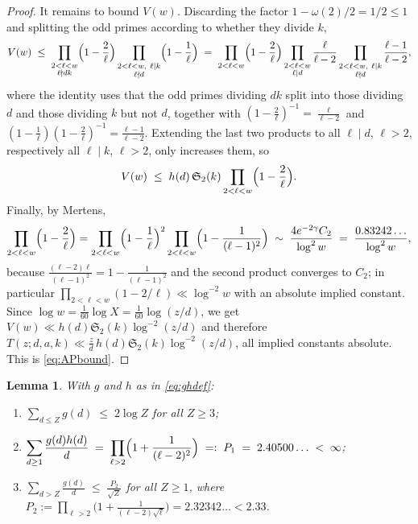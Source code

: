 \documentclass[10pt]{article}
\newtheorem{lemma}{Lemma}
\theoremstyle{definition}
\theoremstyle{remark}
\begin{document}
\begin{proof}
It remains to bound $V(w)$. Discarding the factor $1 - \omega(2)/2 = 1/2 \le 1$
and splitting the odd primes according to whether they divide $k$,
\[
  V(w) \;\le\;
  \prod_{\substack{2 < \ell < w \\ \ell \nmid dk}}\Bigl(1 - \frac{2}{\ell}\Bigr)
  \prod_{\substack{2 < \ell < w,\ \ell \mid k \\ \ell \nmid d}}
    \Bigl(1 - \frac{1}{\ell}\Bigr)
  \;=\;
  \prod_{2 < \ell < w}\Bigl(1 - \frac{2}{\ell}\Bigr)
  \prod_{\substack{2 < \ell < w \\ \ell \mid d}}\frac{\ell}{\ell-2}
  \prod_{\substack{2 < \ell < w,\ \ell \mid k \\ \ell \nmid d}}
    \frac{\ell-1}{\ell-2},
\]
where the identity uses that the odd primes dividing $dk$ split into those
dividing $d$ and those dividing $k$ but not $d$, together with
$(1-\tfrac2\ell)^{-1} = \tfrac{\ell}{\ell-2}$ and
$(1-\tfrac1\ell)(1-\tfrac2\ell)^{-1} = \tfrac{\ell-1}{\ell-2}$. Extending the
last two products to all $\ell \mid d$, $\ell > 2$, respectively all
$\ell \mid k$, $\ell > 2$, only increases them, so
\[
  V(w) \;\le\; h(d)\,\mathfrak{S}_2(k)\prod_{2<\ell<w}\Bigl(1-\frac{2}{\ell}\Bigr).
\]
Finally, by Mertens,
\[
  \prod_{2 < \ell < w}\Bigl(1 - \frac{2}{\ell}\Bigr)
  = \prod_{2 < \ell < w}\Bigl(1 - \frac{1}{\ell}\Bigr)^{2}
    \prod_{2 < \ell < w}\Bigl(1 - \frac{1}{(\ell-1)^{2}}\Bigr)
  \;\sim\; \frac{4e^{-2\gamma}C_2}{\log^{2}w}
  \;=\; \frac{0.83242\ldots}{\log^{2}w},
\]
because $\frac{(\ell-2)\ell}{(\ell-1)^{2}} = 1 - \frac{1}{(\ell-1)^{2}}$ and
the second product converges to $C_2$; in particular
$\prod_{2<\ell<w}(1-2/\ell) \ll \log^{-2}w$ with an absolute implied constant.
Since $\log w = \tfrac{1}{60}\log X = \tfrac{1}{60}\log(z/d)$, we get
$V(w) \ll h(d)\mathfrak{S}_2(k)\log^{-2}(z/d)$ and therefore
$T(z;d,a,k) \ll \frac{z}{d}\,h(d)\mathfrak{S}_2(k)\log^{-2}(z/d)$, all implied
constants absolute. This is \eqref{eq:APbound}.
\end{proof}

\begin{lemma}\label{lem:sums}
With $g$ and $h$ as in \eqref{eq:ghdef}:
\begin{enumerate}
\item[(i)] $\displaystyle \sum_{d \le Z} g(d) \;\le\; 2\log Z$ for all
  $Z \ge 3$;
\item[(ii)] $\displaystyle \sum_{d \ge 1} \frac{g(d) h(d)}{d}
  \;=\; \prod_{\ell > 2}\Bigl(1 + \frac{1}{(\ell-2)^{2}}\Bigr)
  \;=:\; P_1 \;=\; 2.40500\ldots \;<\; \infty$;
\item[(iii)] $\displaystyle \sum_{d > Z} \frac{g(d)}{d}
  \;\le\; \frac{P_2}{\sqrt{Z}}$ for all $Z \ge 1$, where
  $P_2 := \prod_{\ell>2}\bigl(1 + \frac{1}{(\ell-2)\sqrt{\ell}}\bigr)
  = 2.32342\ldots < 2.33$.
\end{enumerate}
\end{lemma}
\end{document}
